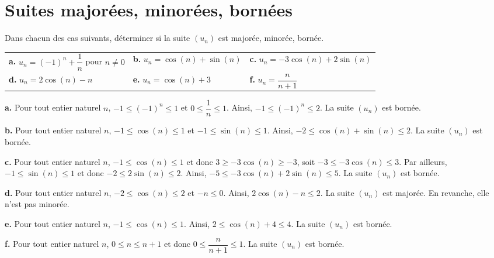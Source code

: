 \documentclass[11pt,fleqn]{book} %
\begin{document}
\begin{solution}
\end{solution}

\section*{Suites majorées, minorées, bornées}

\begin{exercise}
Dans chacun des cas suivants, déterminer si la suite $(u_n)$ est majorée, minorée, bornée.

\renewcommand{\arraystretch}{2.5}
\begin{tabularx}{\linewidth}{XXX}

\textbf{a.} $u_n= (-1)^n+\dfrac{1}{n}$ pour $n\neq 0$ & \textbf{b.} $u_n= \cos(n) + \sin (n)$ & \textbf{c.} $u_n= -3\cos(n)+2\sin(n)$ \\
\textbf{d.} $u_n= 2\cos(n)-n$ & \textbf{e.} $u_n = \cos (n) + 3$ & \textbf{f.} $u_n = \dfrac{n}{n+1}$ \\
\end{tabularx}\end{exercise}

\begin{solution} \textbf{a.} Pour tout entier naturel $n$, $-1 \leqslant (-1)^n \leqslant 1$ et $0\leqslant \dfrac{1}{n} \leqslant 1$. Ainsi, $-1 \leqslant (-1)^n \leqslant 2$. La suite $(u_n)$ est bornée.

\textbf{b.} Pour tout entier naturel $n$, $-1 \leqslant \cos(n) \leqslant 1$ et $-1\leqslant  \sin(n) \leqslant 1$. Ainsi, $-2 \leqslant \cos(n)+\sin(n) \leqslant 2$. La suite $(u_n)$ est bornée.

\textbf{c.} Pour tout entier naturel $n$, $-1 \leqslant \cos(n) \leqslant 1$ et donc $ 3 \geqslant -3 \cos(n) \geqslant -3$, soit $-3 \leqslant -3 \cos(n) \leqslant 3$. Par ailleurs, $-1\leqslant  \sin(n) \leqslant 1$ et donc $-2\leqslant 2\sin(n) \leqslant 2$. Ainsi, $-5 \leqslant -3\cos(n)+2\sin(n) \leqslant 5$. La suite $(u_n)$ est bornée.

\textbf{d.} Pour tout entier naturel $n$, $-2 \leqslant \cos (n) \leqslant 2$ et $-n \leqslant 0$. Ainsi, $2\cos(n) -n \leqslant 2$. La suite $(u_n)$ est majorée. En revanche, elle n'est pas minorée.

\textbf{e.} Pour tout entier naturel $n$, $-1 \leqslant \cos(n) \leqslant 1$. Ainsi, $2 \leqslant \cos(n)+4 \leqslant 4$. La suite $(u_n)$ est bornée.

\textbf{f.} Pour tout entier naturel $n$, $0 \leqslant n \leqslant n+1$ et donc $ 0\leqslant \dfrac{n}{n+1} \leqslant 1$. La suite $(u_n)$ est bornée.\end{solution}
\end{document}
